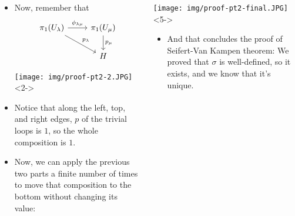 \documentclass[8pt]{beamer}
\begin{document}
  \begin{frame}
    \begin{columns}
      \begin{column}[T]{0.5\textwidth}
        \begin{itemize}
          \item<1-> Now, remember that
            \[\begin{tikzcd}[ampersand replacement=\&]
              \pi_1(U_\lambda) \ar[rd, "p_\lambda"]
              \ar[r,"\phi_{\lambda\mu}"] \& \pi_1(U_\mu) \ar[d, "p_\mu"]\\
                  \& H
              \end{tikzcd}\]
            \begin{center}
              \texttt{[image: img/proof-pt2-2.JPG]}<2->
            \end{center}

          \item<3-> Notice that along the left, top, and right edges, $p$ of the trivial
            loops is $1$, so the whole composition is $1$.

          \item<4-> Now, we can apply the previous two parts a finite number of times to
            move that composition to the bottom without changing its value:


        \end{itemize}
      \end{column}
      \begin{column}[T]{0.5\textwidth}
            \begin{center}
              \texttt{[image: img/proof-pt2-final.JPG]}<5->
            \end{center}
        \begin{itemize}
          \item<5-> And that concludes the proof of Seifert-Van Kampen theorem: We
            proved that $\sigma$ is well-defined, so it exists, and we know that
            it's unique.
        \end{itemize}
      \end{column}
    \end{columns}
  \end{frame}
\end{document}
